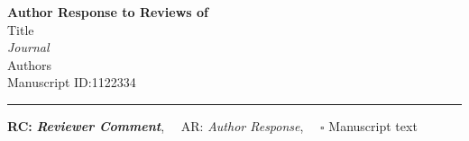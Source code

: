 \providecommand{\lettertitle}{Author Response to Reviews of}
\providecommand{\papertitle}{Title}
\providecommand{\authors}{Authors}
\providecommand{\journal}{Journal}
\providecommand{\doi}{--}





{\Large\bf \lettertitle}\\[1em]
{\huge \papertitle}\\[1em]
{\it \journal}%
\\
{\authors}\\
Manuscript ID:1122334
\\
\hrule

\hfill {\bfseries RC:} \textbf{\textit{Reviewer Comment}},\(\quad\) AR: \emph{Author Response}, \(\quad\square\) Manuscript text
